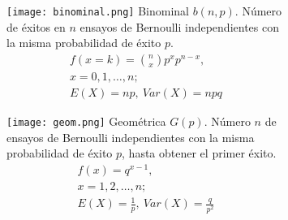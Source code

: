 \begin{figure}[H]\caption[Distribuciones]{Existe diversidad de distribuciones para modelar v.a.s, a continuación se muestran las mas importantes de acuerdo a \citeauthor{bala20} (\citeyear{bala20}). De las siguientes son aptas para v.a.d.s hasta la distribución Normal, mientras que las v.a.c.s pueden ser modeladas desde la distribución Uniforme.}\label{FIG:DISTS}
\begin{subfigure}[t]{.475\textwidth}\texttt{[image: binominal.png]}
Binominal $b(n,p)$. Número de éxitos en $n$ ensayos de Bernoulli independientes con la misma probabilidad de éxito $p$.
\begin{equation}\begin{matrix}
f(x=k)=\binom{n}{x}p^xp^{n-x},\\
x=0,1,\ldots,n;\\
E(X)=np,\ Var(X)=npq
\end{matrix}\end{equation}\end{subfigure}\qquad
\begin{subfigure}[t]{.475\textwidth}\texttt{[image: geom.png]}
Geométrica $G(p)$.
Número $n$ de ensayos de Bernoulli independientes con la misma probabilidad de éxito $p$, hasta obtener el primer éxito.
\begin{equation}\begin{matrix}
f(x)=q^{x-1},\\
x=1,2,\ldots,n;\\
E(X)=\frac{1}{p},\ Var(X)=\frac{q}{p^2}
\end{matrix}\end{equation}\end{subfigure}
\end{figure}



